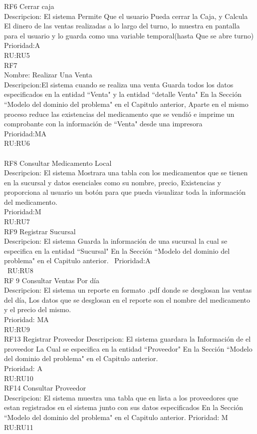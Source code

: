 RF6 Cerrar caja\\
Descripcion: El sistema Permite Que el usuario Pueda cerrar la Caja, y Calcula El dinero de las ventas realizadas a lo largo del turno, lo muestra en pantalla para el usuario y lo guarda como una variable temporal(hasta Que se abre turno)\\
Prioridad:A\\
RU:RU5
\\
RF7\\
Nombre: Realizar Una Venta\\
Descripcion:El sistema cuando se realiza una venta Guarda todos los datos especificados en la entidad ``Venta" y la entidad ``detalle Venta" En la Sección ``Modelo del dominio del problema" en el  Capitulo anterior, Aparte en el mismo proceso reduce las existencias del medicamento que se vendió e imprime un comprobante con la información de ``Venta" desde una impresora\\
Prioridad:MA\\
RU:RU6\\
\\
RF8 Consultar Medicamento Local\\
Descripcion: El sistema Mostrara una tabla con los medicamentos que se tienen en la sucursal y datos esenciales como su nombre, precio, Existencias y proporciona al usuario un botón para que pueda visualizar toda la información del medicamento.\\
Prioridad:M\\
RU:RU7
\\
RF9 Registrar Sucursal\\
Descripcion: El sistema Guarda la información de una sucursal la cual se especifica en la entidad ``Sucursal" En la Sección ``Modelo del dominio del problema" en el  Capitulo anterior. \
Prioridad:A\\\
RU:RU8
\\
RF 9 Consultar Ventas Por día\\
Descripcion: El sistema un reporte en formato .pdf donde se desglosan las ventas del día, Los datos que se desglosan en el reporte son el nombre del medicamento y el precio del mismo.\\
Prioridad: MA\\
RU:RU9
\\
RF13 Registrar Proveedor
Descripcion: El sistema guardara la Información de el proveedor La Cual se especifica en la entidad ``Proveedor" En la Sección ``Modelo del dominio del problema" en el  Capitulo anterior.\\
Prioridad: A\\
RU:RU10
\\
RF14 Consultar Proveedor\\
Descripcion: El sistema muestra una tabla que en lista a los proveedores que estan registrados en el sistema junto con sus datos especificados En la Sección ``Modelo del dominio del problema" en el  Capitulo anterior.
Prioridad: M\\
RU:RU11
\newpage

